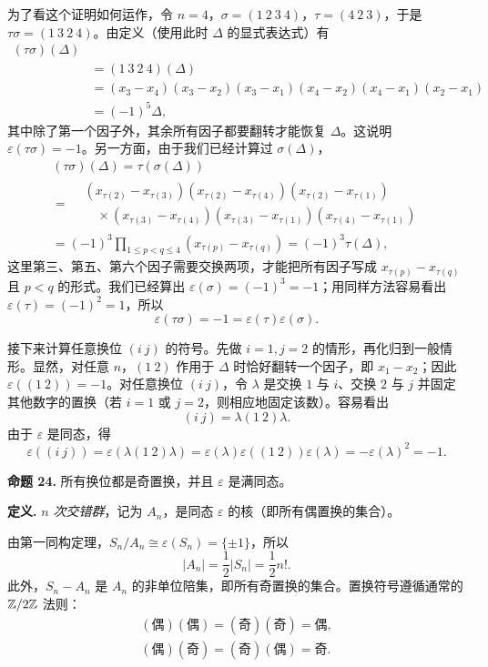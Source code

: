 为了看这个证明如何运作，令 $n=4$，$\sigma=(1\ 2\ 3\ 4)$，$\tau=(4\ 2\ 3)$，于是 $\tau\sigma=(1\ 3\ 2\ 4)$。由定义（使用此时 $\Delta$ 的显式表达式）有
\begin{align*}
  (\tau\sigma)(\Delta)\\
  &=(1\ 3\ 2\ 4)(\Delta)\\
  &=(x_3-x_4)(x_3-x_2)(x_3-x_1)(x_4-x_2)(x_4-x_1)(x_2-x_1)\\
  &=(-1)^5\Delta,
\end{align*}
其中除了第一个因子外，其余所有因子都要翻转才能恢复 $\Delta$。这说明 $\varepsilon(\tau\sigma)=-1$。另一方面，由于我们已经计算过 $\sigma(\Delta)$，
\begin{align*}
  (\tau\sigma)(\Delta)
  =\tau(\sigma(\Delta))\\
  =\begin{aligned}
  &(x_{\tau(2)}-x_{\tau(3)})(x_{\tau(2)}-x_{\tau(4)})(x_{\tau(2)}-x_{\tau(1)})\\
  &\quad\times(x_{\tau(3)}-x_{\tau(4)})(x_{\tau(3)}-x_{\tau(1)})(x_{\tau(4)}-x_{\tau(1)})
  \end{aligned}\\
  =(-1)^3\!\prod_{1\leq p<q\leq 4}\!(x_{\tau(p)}-x_{\tau(q)})=(-1)^3\tau(\Delta),
\end{align*}
这里第三、第五、第六个因子需要交换两项，才能把所有因子写成 $x_{\tau(p)}-x_{\tau(q)}$ 且 $p<q$ 的形式。我们已经算出 $\varepsilon(\sigma)=(-1)^3=-1$；用同样方法容易看出 $\varepsilon(\tau)=(-1)^2=1$，所以
\[
  \varepsilon(\tau\sigma)=-1=\varepsilon(\tau)\varepsilon(\sigma).
\]

接下来计算任意换位 $(i\ j)$ 的符号。先做 $i=1,j=2$ 的情形，再化归到一般情形。显然，对任意 $n$，$(1\ 2)$ 作用于 $\Delta$ 时恰好翻转一个因子，即 $x_1-x_2$；因此 $\varepsilon((1\ 2))=-1$。对任意换位 $(i\ j)$，令 $\lambda$ 是交换 $1$ 与 $i$、交换 $2$ 与 $j$ 并固定其他数字的置换（若 $i=1$ 或 $j=2$，则相应地固定该数）。容易看出
\[
  (i\ j)=\lambda(1\ 2)\lambda.
\]
由于 $\varepsilon$ 是同态，得
\[
  \varepsilon((i\ j))=\varepsilon(\lambda(1\ 2)\lambda)
  =\varepsilon(\lambda)\varepsilon((1\ 2))\varepsilon(\lambda)
  =-\varepsilon(\lambda)^2=-1.
\]

\medskip
\noindent\textbf{命题 24.} 所有换位都是奇置换，并且 $\varepsilon$ 是满同态。

\noindent\textbf{定义.} \emph{$n$ 次交错群}，记为 $A_n$，是同态 $\varepsilon$ 的核（即所有偶置换的集合）。

由第一同构定理，$S_n/A_n\cong\varepsilon(S_n)=\{\pm1\}$，所以
\[
  |A_n|=\frac12|S_n|=\frac12 n!.
\]
此外，$S_n-A_n$ 是 $A_n$ 的非单位陪集，即所有奇置换的集合。置换符号遵循通常的 $\mathbb{Z}/2\mathbb{Z}$ 法则：
\[
\begin{array}{c}
(\text{偶})(\text{偶})=(\text{奇})(\text{奇})=\text{偶},\\
(\text{偶})(\text{奇})=(\text{奇})(\text{偶})=\text{奇}.
\end{array}
\]

